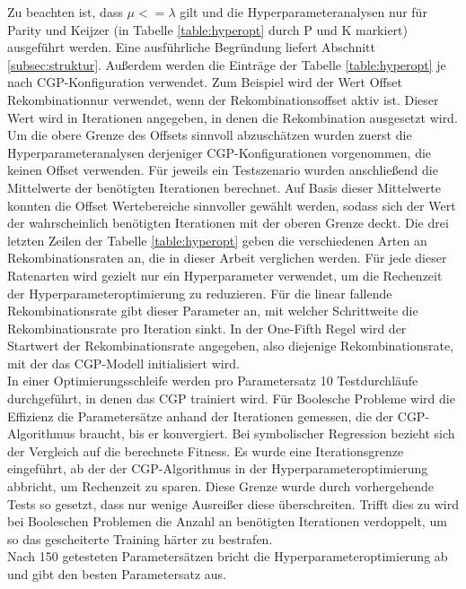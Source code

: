 Zu beachten ist, dass $\mu <= \lambda$ gilt und die Hyperparameteranalysen nur für Parity und Keijzer (in Tabelle \ref{table:hyperopt} durch P und K markiert) ausgeführt werden.
Eine ausführliche Begründung liefert Abschnitt \ref{subsec:struktur}.
Außerdem werden die Einträge der Tabelle \ref{table:hyperopt} je nach CGP-Konfiguration verwendet.
Zum Beispiel wird der Wert \glqq Offset Rekombination\grqq\space nur verwendet, wenn der Rekombinationsoffset aktiv ist. 
Dieser Wert wird in Iterationen angegeben, in denen die Rekombination ausgesetzt wird.
Um die obere Grenze des Offsets sinnvoll abzuschätzen wurden zuerst die Hyperparameteranalysen derjeniger CGP-Konfigurationen vorgenommen, die keinen Offset verwenden.
Für jeweils ein Testszenario wurden anschließend die Mittelwerte der benötigten Iterationen berechnet.
Auf Basis dieser Mittelwerte konnten die Offset Wertebereiche sinnvoller gewählt werden, sodass sich der Wert der wahrscheinlich benötigten Iterationen mit der oberen Grenze deckt.
Die drei letzten Zeilen der Tabelle \ref{table:hyperopt} geben die verschiedenen Arten an Rekombinationsraten an, die in dieser Arbeit verglichen werden.
Für jede dieser Ratenarten wird gezielt nur ein Hyperparameter verwendet, um die Rechenzeit der Hyperparameteroptimierung zu reduzieren.
Für die linear fallende Rekombinationsrate gibt dieser Parameter an, mit welcher Schrittweite die Rekombinationsrate pro Iteration sinkt.
In der One-Fifth Regel wird der Startwert der Rekombinationsrate angegeben, also diejenige Rekombinationsrate, mit der das CGP-Modell initialisiert wird.\\

In einer Optimierungsschleife werden pro Parametersatz 10 Testdurchläufe durchgeführt, in denen das CGP trainiert wird.
Für Boolesche Probleme wird die Effizienz die Parametersätze anhand der Iterationen gemessen, die der CGP-Algorithmus braucht, bis er konvergiert.
Bei symbolischer Regression bezieht sich der Vergleich auf die berechnete Fitness.
Es wurde eine Iterationsgrenze eingeführt, ab der der CGP-Algorithmus in der Hyperparameteroptimierung abbricht, um Rechenzeit zu sparen.
Diese Grenze wurde durch vorhergehende Tests so gesetzt, dass nur wenige Ausreißer diese überschreiten.
Trifft dies zu wird bei Booleschen Problemen die Anzahl an benötigten Iterationen verdoppelt, um so das gescheiterte Training härter zu bestrafen.\\
Nach 150 getesteten Parametersätzen bricht die Hyperparameteroptimierung ab und gibt den besten Parametersatz aus.\\

